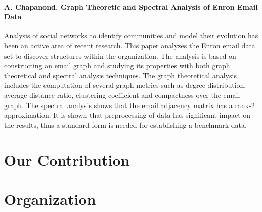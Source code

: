 \paragraph*{A. Chapanond. Graph Theoretic and Spectral Analysis
of Enron Email Data}
\cite{chapanond2005graph}
Analysis of social networks to identify communities and model their evolution has been an active area of recent research. This paper analyzes the Enron email data set to discover structures within the organization. The analysis is based on constructing an email graph and studying its properties with both graph theoretical and spectral analysis techniques. The graph theoretical analysis includes the computation of several graph metrics such as degree distribution, average distance ratio, clustering coefficient and compactness over the email graph. The spectral analysis shows that the email adjacency matrix has a rank-2 approximation. It is shown that preprocessing of data has significant impact on the results, thus a standard form is needed for establishing a benchmark data.

\cite{wei1994time}

\section{Our Contribution}

\section{Organization}
